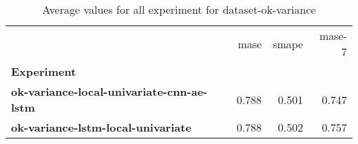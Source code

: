 \begin{table}[h]
\centering
\caption{Average values for all experiment for dataset-ok-variance}
\label{table:Average-metric-dataset-ok-variance}
\begin{tabular}{lrrr}
\toprule
{} &   mase &  smape &  mase-7 \\
\textbf{Experiment                              } &        &        &         \\
\midrule
\textbf{ok-variance-local-univariate-cnn-ae-lstm} &  0.788 &  0.501 &   0.747 \\
\textbf{ok-variance-lstm-local-univariate       } &  0.788 &  0.502 &   0.757 \\
\bottomrule
\end{tabular}
\end{table}
